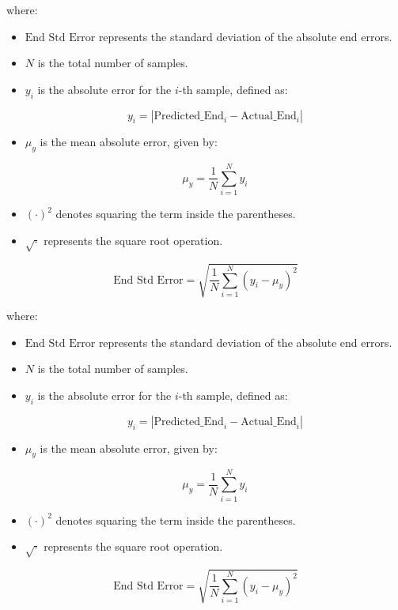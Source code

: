 \documentclass[12pt]{report}
\begin{document}
where:
\begin{itemize}
	\item \(\text{End Std Error}\) represents the standard deviation of the absolute end errors.
	\item \( N \) is the total number of samples.
	\item \( y_i \) is the absolute error for the \( i \)-th sample, defined as:
	
	\[
	y_i = |\text{Predicted\_End}_i - \text{Actual\_End}_i|
	\]
	
	\item \( \mu_y \) is the mean absolute error, given by:
	
	\[
	\mu_y = \frac{1}{N} \sum_{i=1}^{N} y_i
	\]
	
	\item \( (\cdot)^2 \) denotes squaring the term inside the parentheses.
	\item \( \sqrt{\cdot} \) represents the square root operation.
\end{itemize}
\begin{equation}
	\text{End Std Error} = \sqrt{\frac{1}{N} \sum_{i=1}^{N} \left( y_i - \mu_y \right)^2}
	\label{eq:end_std_error}
\end{equation}

where:
\begin{itemize}
	\item \(\text{End Std Error}\) represents the standard deviation of the absolute end errors.
	\item \( N \) is the total number of samples.
	\item \( y_i \) is the absolute error for the \( i \)-th sample, defined as:
	
	\[
	y_i = |\text{Predicted\_End}_i - \text{Actual\_End}_i|
	\]
	
	\item \( \mu_y \) is the mean absolute error, given by:
	
	\[
	\mu_y = \frac{1}{N} \sum_{i=1}^{N} y_i
	\]
	
	\item \( (\cdot)^2 \) denotes squaring the term inside the parentheses.
	\item \( \sqrt{\cdot} \) represents the square root operation.
\end{itemize}


\begin{equation}
	\text{End Std Error} = \sqrt{\frac{1}{N} \sum_{i=1}^{N} \left( y_i - \mu_y \right)^2}
	\label{eq:end_std_error}
\end{equation}
\end{document}
